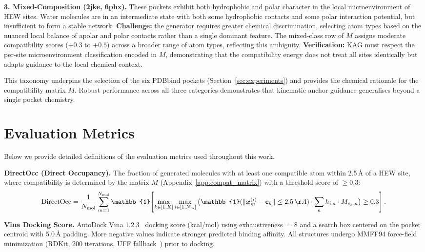\documentclass{article}
\begin{document}
\vspace{4pt}
\noindent\textbf{3. Mixed-Composition (2jke, 6phx).}
These pockets exhibit both hydrophobic and polar character in the local
microenvironment of HEW sites.  Water molecules are in an intermediate
state with both some hydrophobic contacts and some polar interaction
potential, but insufficient to form a stable network.  \textbf{Challenge:}
the generator requires greater chemical discrimination, selecting atom
types based on the nuanced local balance of apolar and polar contacts
rather than a single dominant feature.  The mixed-class row of $M$
assigns moderate compatibility scores ($+0.3$ to $+0.5$) across a broader
range of atom types, reflecting this ambiguity.  \textbf{Verification:}
KAG must respect the per-site microenvironment classification encoded in
$M$, demonstrating that the compatibility energy does not treat all sites
identically but adapts guidance to the local chemical context.

\noindent This taxonomy underpins the selection of the six PDBbind pockets
(Section~\ref{sec:experiments}) and provides the chemical rationale for the
compatibility matrix $M$.  Robust performance across all three categories
demonstrates that kinematic anchor guidance generalises beyond a single
pocket chemistry.

\section{Evaluation Metrics}
\label{app:metrics}

Below we provide detailed definitions of the evaluation metrics used
throughout this work.

\vspace{4pt}
\noindent\textbf{DirectOcc (Direct Occupancy).}
The fraction of generated molecules with at least one compatible atom
within 2.5\,\AA{} of a HEW site, where compatibility is determined by
the matrix $M$ (Appendix~\ref{app:compat_matrix}) with a threshold score
of $\ge 0.3$:
\begin{equation}
\mathrm{DirectOcc} = \frac{1}{N_{\text{mol}}}
  \sum_{m=1}^{N_{\text{mol}}}
  \mathbb{1}\!\left[
    \max_{k \in [1,K]} \max_{i \in [1, N_m]}
    \big(
      \mathbb{1}(\|\bm{x}_m^{(i)} - \mathbf{c}_k\| \le 2.5\,\AA)
      \cdot \sum_{a} h_{i,a} \cdot M_{e_k, a}
    \big) \ge 0.3
  \right].
\end{equation}

\vspace{4pt}
\noindent\textbf{Vina Docking Score.}
AutoDock Vina 1.2.3~\cite{trott2010vina} docking score (kcal/mol) using
exhaustiveness $=8$ and a search box centered on the pocket centroid with
5.0\,\AA{} padding.  More negative values indicate stronger predicted
binding affinity.  All structures undergo MMFF94 force-field minimization
(RDKit, 200 iterations, UFF fallback~\cite{halgren1996mmff94,rappe1992uff})
prior to docking.
\end{document}
